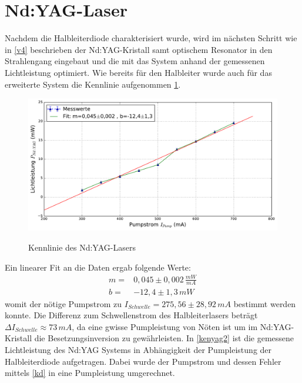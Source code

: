 \documentclass[twoside,colorback,accentcolor=tud4c,11pt]{tudreport}
\begin{document}
\section{Nd:YAG-Laser}
Nachdem die Halbleiterdiode charakterisiert wurde, wird im nächsten Schritt wie in \ref{v4} beschrieben der Nd:YAG-Kristall samt optischem Resonator in den Strahlengang eingebaut und die mit das System anhand der gemessenen Lichtleistung optimiert. Wie bereits für den Halbleiter wurde auch für das erweiterte System die Kennlinie aufgenommen \ref{kenyag}.
\begin{figure}[H]
\centering
   	\begin{minipage}[b]{0.9\textwidth}
   	\includegraphics[width=\textwidth]{graphics/kenn_ndyag_PS.pdf}
  	\label{kenyag}
   	\end{minipage}
\caption{Kennlinie des Nd:YAG-Lasers}	
\end{figure}
Ein linearer Fit an die Daten ergab folgende Werte:
\begin{align}
m=& 0,045 \pm 0,002\,\si{\frac{mW}{mA}}\\
b=& -12,4 \pm 1,3\,\si{mW}
\end{align}
womit der nötige Pumpstrom zu $I_{Schwelle}=275,56\pm 28,92\,\si{mA}$ bestimmt werden konnte. Die Differenz zum Schwellenstrom des Halbleiterlasers beträgt $\Delta I_{Schwelle}\approx 73\,\si{mA}$, da eine gwisse Pumpleistung von Nöten ist um im Nd:YAG-Kristall die Besetzungsinversion zu gewährleisten. In \ref{kenyag2} ist die gemessene Lichtleistung des Nd:YAG Systems in Abhängigkeit der Pumpleistung der Halbleiterdiode aufgetragen. Dabei wurde der Pumpstrom und dessen Fehler mittels \ref{kd} in eine Pumpleistung umgerechnet.
\end{document}
